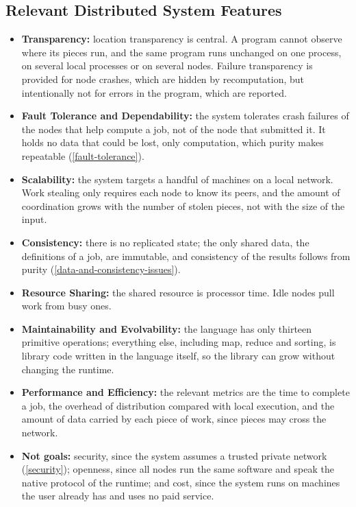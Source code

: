 \documentclass{scrartcl}
\begin{document}
\subsection{Relevant Distributed System Features}
\label{ds-features}

\begin{itemize}
  \item \textbf{Transparency:} location transparency is central. A program cannot observe where its pieces run, and the same program runs unchanged on one process, on several local processes or on several nodes. Failure transparency is provided for node crashes, which are hidden by recomputation, but intentionally not for errors in the program, which are reported.

  \item \textbf{Fault Tolerance and Dependability:} the system tolerates crash failures of the nodes that help compute a job, not of the node that submitted it. It holds no data that could be lost, only computation, which purity makes repeatable (\cref{fault-tolerance}).

  \item \textbf{Scalability:} the system targets a handful of machines on a local network. Work stealing only requires each node to know its peers, and the amount of coordination grows with the number of stolen pieces, not with the size of the input.

  \item \textbf{Consistency:} there is no replicated state; the only shared data, the definitions of a job, are immutable, and consistency of the results follows from purity (\cref{data-and-consistency-issues}).

  \item \textbf{Resource Sharing:} the shared resource is processor time. Idle nodes pull work from busy ones.

  \item \textbf{Maintainability and Evolvability:} the language has only thirteen primitive operations; everything else, including map, reduce and sorting, is library code written in the language itself, so the library can grow without changing the runtime.

  \item \textbf{Performance and Efficiency:} the relevant metrics are the time to complete a job, the overhead of distribution compared with local execution, and the amount of data carried by each piece of work, since pieces may cross the network.

  \item \textbf{Not goals:} security, since the system assumes a trusted private network (\cref{security}); openness, since all nodes run the same software and speak the native protocol of the runtime; and cost, since the system runs on machines the user already has and uses no paid service.
\end{itemize}
\end{document}

